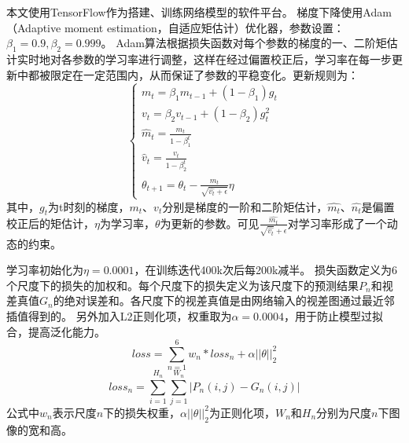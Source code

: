 本文使用TensorFlow\cite{abadi2016tensorflow}作为搭建、训练网络模型的软件平台。
梯度下降使用Adam（Adaptive moment estimation，自适应矩估计）优化器\cite{kingma2014adam}，参数设置：$\beta_1=0.9, \beta_2=0.999$。
Adam算法根据损失函数对每个参数的梯度的一、二阶矩估计实时地对各参数的学习率进行调整，这样在经过偏置校正后，学习率在每一步更新中都被限定在一定范围内，从而保证了参数的平稳变化。更新规则为：
\begin{equation}\label{eq_4_2_Adam}
\begin{cases}
m_t = \beta_1 m_{t-1} + (1 - \beta_1)g_t \\
v_t = \beta_2 v_{t-1} + (1 - \beta_2) g_t^2 \\
\hat{m}_t = \frac{m_t}{1 - \beta_1^t} \\
\hat{v}_t = \frac{v_t}{1 - \beta_2^{t}} \\
\theta_{t+1} = \theta_t - \frac{\hat{m}_t}{\sqrt{\hat{v_t} + \epsilon}} \eta
\end{cases}
\end{equation}
其中，$g_t$为t时刻的梯度，$m_t$、$v_t$分别是梯度的一阶和二阶矩估计，$\hat{m_t}$、$\hat{n_t}$是偏置校正后的矩估计，$\eta$为学习率，$\theta$为更新的参数。可见$\frac{\hat{m_t}}{\sqrt{\hat{v_t}}+\epsilon}$对学习率形成了一个动态的约束。

学习率初始化为$\eta=0.0001$，在训练迭代400k次后每200k减半。
损失函数定义为6个尺度下的损失的加权和。每个尺度下的损失定义为该尺度下的预测结果$P_n$和视差真值$G_n$的绝对误差和。各尺度下的视差真值是由网络输入的视差图通过最近邻插值得到的。
另外加入L2正则化项，权重取为$\alpha=0.0004$，用于防止模型过拟合，提高泛化能力。
\begin{equation}\label{eq:4_2_loss_all}
loss = \sum_{n=1}^{6}{w_n * loss_n} + \alpha ||\theta||_2^2
\end{equation}
\begin{equation}\label{eq:4_2_loss_single}
loss_n = \sum_{i=1}^{H_n}\sum_{j=1}^{W_n}{|P_n(i, j) - G_n(i, j)|}
\end{equation}
公式中$w_n$表示尺度$n$下的损失权重，$\alpha||\theta||_2^2$为正则化项，$W_n$和$H_n$分别为尺度$n$下图像的宽和高。

